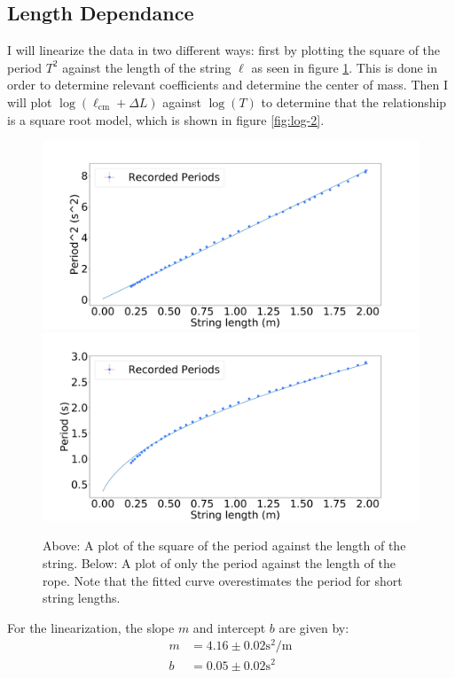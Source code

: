 \documentclass[%
 reprint,
 amsmath,amssymb
 aps,
]{revtex4-2}
\begin{document}
\subsection{Length Dependance}
I will linearize the data in two different ways: first by plotting the square of the period $T^2$ against the length of the string $\ell$ as seen in figure \ref{fig:linear-1}. This is done in order to determine relevant coefficients and determine the center of mass. Then I will plot $\log(\ell_\text{cm}+\Delta L)$ against $\log(T)$ to determine that the relationship is a square root model, which is shown in figure \ref{fig:log-2}.
\begin{figure}[!h]
    \includegraphics[width=\linewidth]{Figures/linear_1.png}
    \includegraphics[width=\linewidth]{Figures/normal_1.png}

    \caption{Above: A plot of the square of the period against the length of the string. Below: A plot of only the period against the length of the rope. Note that the fitted curve overestimates the period for short string lengths.}
    \label{fig:linear-1}
\end{figure}
For the linearization, the slope $m$ and intercept $b$ are given by:
\begin{align}
    m &= 4.16 \pm 0.02 \si{\second\squared\per\meter} \\ 
    b &= 0.05 \pm 0.02 \si{\second\squared}
\end{align}
\end{document}

